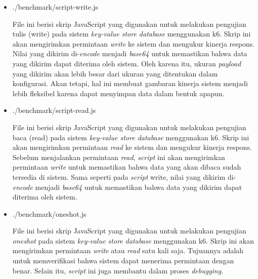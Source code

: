 \begin{itemize}
  \item ./benchmark/script-write.js

  File ini berisi skrip JavaScript yang digunakan untuk melakukan pengujian tulis (write) pada sistem \textit{key-value store database} menggunakan k6. Skrip ini akan mengirimkan permintaan \textit{write} ke sistem dan mengukur kinerja respons. Nilai yang dikirim di-\textit{encode} menjadi \textit{base64} untuk memastikan bahwa data yang dikirim dapat diterima oleh sistem. Oleh karena itu, ukuran \textit{payload} yang dikirim akan lebih besar dari ukuran yang ditentukan dalam konfigurasi. Akan tetapi, hal ini membuat gambaran kinerja sistem menjadi lebih fleksibel karena dapat menyimpan data dalam bentuk apapun.

  \item ./benchmark/script-read.js
  
  File ini berisi skrip JavaScript yang digunakan untuk melakukan pengujian baca (read) pada sistem \textit{key-value store database} menggunakan k6. Skrip ini akan mengirimkan permintaan \textit{read} ke sistem dan mengukur kinerja respons. Sebelum menjalankan permintaan \textit{read}, \textit{script} ini akan mengirimkan permintaan \textit{write} untuk memastikan bahwa data yang akan dibaca sudah tersedia di sistem. Sama seperti pada \textit{script} write, nilai yang dikirim di-\textit{encode} menjadi \textit{base64} untuk memastikan bahwa data yang dikirim dapat diterima oleh sistem.

  \item ./benchmark/oneshot.js
  
  File ini berisi skrip JavaScript yang digunakan untuk melakukan pengujian \textit{oneshot} pada sistem \textit{key-value store database} menggunakan k6. Skrip ini akan mengirimkan permintaan \textit{write} atau \textit{read} satu kali saja. Tujuannya adalah untuk memverifikasi bahwa sistem dapat menerima permintaan dengan benar. Selain itu, \textit{script} ini juga membantu dalam proses \textit{debugging}.
\end{itemize}